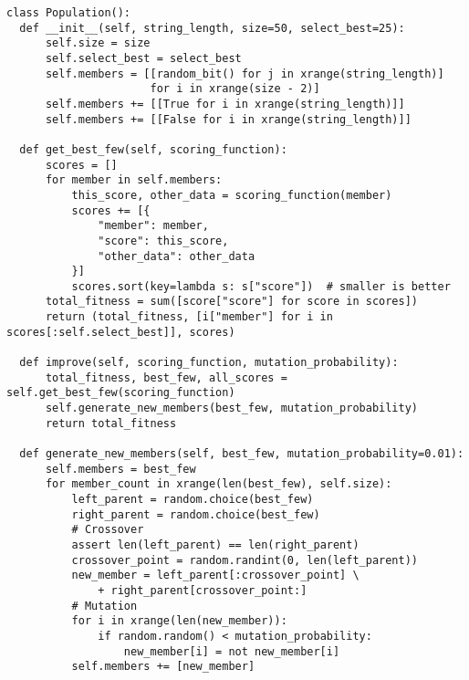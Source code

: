 \begin{minipage}{\textwidth+2cm}
  \begin{lstlisting}
class Population():
  def __init__(self, string_length, size=50, select_best=25):
      self.size = size
      self.select_best = select_best
      self.members = [[random_bit() for j in xrange(string_length)]
                      for i in xrange(size - 2)]
      self.members += [[True for i in xrange(string_length)]]
      self.members += [[False for i in xrange(string_length)]]

  def get_best_few(self, scoring_function):
      scores = []
      for member in self.members:
          this_score, other_data = scoring_function(member)
          scores += [{
              "member": member,
              "score": this_score,
              "other_data": other_data
          }]
          scores.sort(key=lambda s: s["score"])  # smaller is better
      total_fitness = sum([score["score"] for score in scores])
      return (total_fitness, [i["member"] for i in scores[:self.select_best]], scores)

  def improve(self, scoring_function, mutation_probability):
      total_fitness, best_few, all_scores = self.get_best_few(scoring_function)
      self.generate_new_members(best_few, mutation_probability)
      return total_fitness

  def generate_new_members(self, best_few, mutation_probability=0.01):
      self.members = best_few
      for member_count in xrange(len(best_few), self.size):
          left_parent = random.choice(best_few)
          right_parent = random.choice(best_few)
          # Crossover
          assert len(left_parent) == len(right_parent)
          crossover_point = random.randint(0, len(left_parent))
          new_member = left_parent[:crossover_point] \
              + right_parent[crossover_point:]
          # Mutation
          for i in xrange(len(new_member)):
              if random.random() < mutation_probability:
                  new_member[i] = not new_member[i]
          self.members += [new_member]
  \end{lstlisting}
\end{minipage}%

